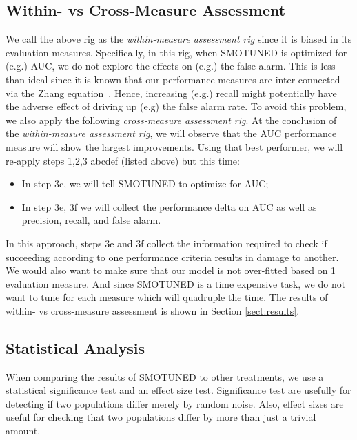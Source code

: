 \documentclass[sigconf,review, anonymous]{acmart}
\newcommand{\bi}{\begin{itemize}[leftmargin=0.4cm]}
\newcommand{\ei}{\end{itemize}}
\theoremstyle{break}
\theoremstyle{break}
\newcommand{\smb}{{\sc SMOTUNED}}
\begin{document}
\subsection{Within- vs Cross-Measure Assessment}
\label{sect:wcm}

We call the above rig as the {\em within-measure assessment rig} since it is  biased in its evaluation measures. Specifically,  in this rig,
when {\smb} is optimized for (e.g.) AUC, we do not explore the effects on (e.g.) the false alarm. This is less than ideal
since it is known that our performance measures are inter-connected via the Zhang equation~\cite{zhang2007comments}. Hence, increasing (e.g.) recall might potentially have the adverse
effect of  driving up (e.g) the false alarm rate. 
To avoid this problem, we also apply the following {\em cross-measure assessment rig}.
At the conclusion of the {\em within-measure assessment rig}, we will observe  that the AUC performance measure will show the largest improvements. Using that best performer, we will re-apply steps 1,2,3 abcdef (listed above) but this time:
\bi
\item In step 3c, we will tell {\smb} to optimize for AUC;
\item In step 3e, 3f we will collect the performance delta on AUC as well as precision, recall,
and false alarm.
\ei
In this approach, steps 3e and 3f collect the information required   to check if succeeding according to one performance criteria results in damage to another. We would also want to make sure that our model is not over-fitted based on 1 evaluation measure. And since {\smb} is a time expensive task, we do not want to tune for each measure which will quadruple the time. The results of within- vs cross-measure assessment is shown in Section \ref{sect:results}.


\subsection{Statistical Analysis}

When comparing the results of {\smb} to other
treatments, we use a statistical
significance test and an effect size test.
Significance test are usefully for detecting if two populations
differ merely by random noise. 
Also, effect sizes are useful for checking that two populations differ by more than just a trivial amount.
\end{document}
